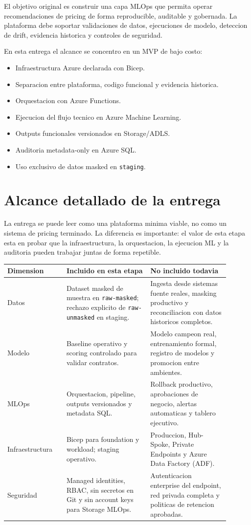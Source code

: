 \documentclass[11pt,letterpaper]{article}
\newcommand{\code}[1]{\texttt{\small #1}}
\begin{document}
El objetivo original es construir una capa MLOps que permita operar recomendaciones de pricing de forma reproducible, auditable y gobernada. La plataforma debe soportar validaciones de datos, ejecuciones de modelo, deteccion de drift, evidencia historica y controles de seguridad.

En esta entrega el alcance se concentro en un MVP de bajo costo:

\begin{itemize}[leftmargin=*]
  \item Infraestructura Azure declarada con Bicep.
  \item Separacion entre plataforma, codigo funcional y evidencia historica.
  \item Orquestacion con Azure Functions.
  \item Ejecucion del flujo tecnico en Azure Machine Learning.
  \item Outputs funcionales versionados en Storage/ADLS.
  \item Auditoria metadata-only en Azure SQL.
  \item Uso exclusivo de datos masked en \code{staging}.
\end{itemize}

\section*{Alcance detallado de la entrega}

La entrega se puede leer como una plataforma minima viable, no como un sistema de pricing terminado. La diferencia es importante: el valor de esta etapa esta en probar que la infraestructura, la orquestacion, la ejecucion ML y la auditoria pueden trabajar juntas de forma repetible.

\begin{longtable}{p{0.24\linewidth}p{0.34\linewidth}p{0.32\linewidth}}
\toprule
\textbf{Dimension} & \textbf{Incluido en esta etapa} & \textbf{No incluido todavia}\\
\midrule
\endhead
Datos & Dataset masked de muestra en \code{raw-masked}; rechazo explicito de \code{raw-unmasked} en staging. & Ingesta desde sistemas fuente reales, masking productivo y reconciliacion con datos historicos completos.\\
Modelo & Baseline operativo y scoring controlado para validar contratos. & Modelo campeon real, entrenamiento formal, registro de modelos y promocion entre ambientes.\\
MLOps & Orquestacion, pipeline, outputs versionados y metadata SQL. & Rollback productivo, aprobaciones de negocio, alertas automaticas y tablero ejecutivo.\\
Infraestructura & Bicep para foundation y workload; staging operativo. & Produccion, Hub-Spoke, Private Endpoints y Azure Data Factory (ADF).\\
Seguridad & Managed identities, RBAC, sin secretos en Git y sin account keys para Storage MLOps. & Autenticacion enterprise del endpoint, red privada completa y politicas de retencion aprobadas.\\
\bottomrule
\end{longtable}
\end{document}
